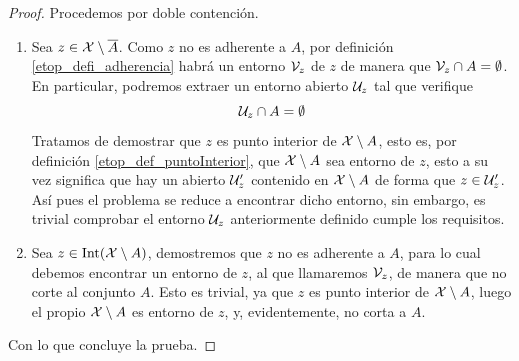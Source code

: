\begin{proof}
	Procedemos por doble contención.
	\begin{enumerate}
		\item[\bsubset] Sea $z\in\mathcal{X}\setminus\overline{A}$. Como $z$ no es adherente a $A$, por definición \eqref{etop_defi_adherencia} habrá un entorno $\mathcal{V}_z$ de $z$ de manera que $\mathcal{V}_z\cap A=\emptyset$. En particular, podremos extraer un entorno abierto $\mathcal{U}_z$ tal que verifique
		\begin{equation*}
		\mathcal{U}_z\cap A =\emptyset
		\end{equation*}
		Tratamos de demostrar que $z$ es punto interior de $\mathcal{X}\setminus A$, esto es, por definición \eqref{etop_def_puntoInterior}, que $\mathcal{X}\setminus A$ sea entorno de $z$, esto a su vez significa que hay un abierto $\mathcal{U}_z'$ contenido en $\mathcal{X}\setminus A$ de forma que $z\in\mathcal{U}_z'$. Así pues el problema se reduce a encontrar dicho entorno, sin embargo, es trivial comprobar el entorno $\mathcal{U}_z$ anteriormente definido cumple los requisitos.
		\item[\bsupset] Sea $z\in\operatorname{\mathrm{Int}}(\mathcal{X}\setminus A)$, demostremos que $z$ no es adherente a $A$, para lo cual debemos encontrar un entorno de $z$, al que llamaremos $\mathcal{V}_z$, de manera que no corte al conjunto $A$. Esto es trivial, ya que $z$ es punto interior de $\mathcal{X}\setminus A$, luego el propio $\mathcal{X}\setminus A$ es entorno de $z$, y, evidentemente, no corta a $A$.
	\end{enumerate}
	Con lo que concluye la prueba.
\end{proof}

